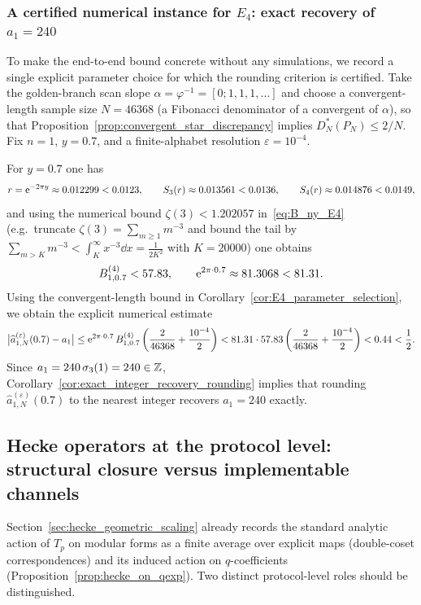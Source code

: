 \subsubsection{A certified numerical instance for \texorpdfstring{$E_4$}{E4}: exact recovery of \texorpdfstring{$a_1=240$}{a1=240}}
\label{app:E4_certified_instance}
To make the end-to-end bound concrete without any simulations, we record a single explicit parameter choice for which the rounding criterion is certified.
Take the golden-branch scan slope $\alpha=\varphi^{-1}=[0;1,1,1,\ldots]$ and choose a convergent-length sample size $N=46368$ (a Fibonacci denominator of a convergent of $\alpha$), so that Proposition~\ref{prop:convergent_star_discrepancy} implies $D_N^\ast(P_N)\le 2/N$.
Fix $n=1$, $y=0.7$, and a finite-alphabet resolution $\varepsilon=10^{-4}$.

For $y=0.7$ one has
\[
r=\mathrm{e}^{-2\pi y}\approx 0.012299<0.0123,
\qquad
S_3(r)\approx 0.013561<0.0136,
\qquad
S_4(r)\approx 0.014876<0.0149,
\]
and using the numerical bound $\zeta(3)<1.202057$ in~\eqref{eq:B_ny_E4} (e.g.\ truncate $\zeta(3)=\sum_{m\ge 1}m^{-3}$ and bound the tail by $\sum_{m>K}m^{-3}<\int_K^\infty x^{-3}\dd x=\frac{1}{2K^2}$ with $K=20000$) one obtains
\[
B_{1,0.7}^{(4)}<57.83,
\qquad
\mathrm{e}^{2\pi\cdot 0.7}\approx 81.3068<81.31.
\]
Using the convergent-length bound in Corollary~\ref{cor:E4_parameter_selection}, we obtain the explicit numerical estimate
\[
\big|\widehat a_{1,N}^{(\varepsilon)}(0.7)-a_1\big|
\le \mathrm{e}^{2\pi\cdot 0.7}\,B_{1,0.7}^{(4)}\left(\frac{2}{46368}+\frac{10^{-4}}{2}\right)
< 81.31\cdot 57.83\left(\frac{2}{46368}+\frac{10^{-4}}{2}\right)
< 0.44
<\frac{1}{2}.
\]
Since $a_1=240\,\sigma_3(1)=240\in\mathbb{Z}$, Corollary~\ref{cor:exact_integer_recovery_rounding} implies that rounding $\widehat a_{1,N}^{(\varepsilon)}(0.7)$ to the nearest integer recovers $a_1=240$ exactly.

\subsection{Hecke operators at the protocol level: structural closure versus implementable channels}
\label{app:hecke_protocol_level}

Section~\ref{sec:hecke_geometric_scaling} already records the standard analytic action of $T_p$ on modular forms as a finite average over explicit maps (double-coset correspondences) and its induced action on $q$-coefficients (Proposition~\ref{prop:hecke_on_qexp}).
Two distinct protocol-level roles should be distinguished.
\par
